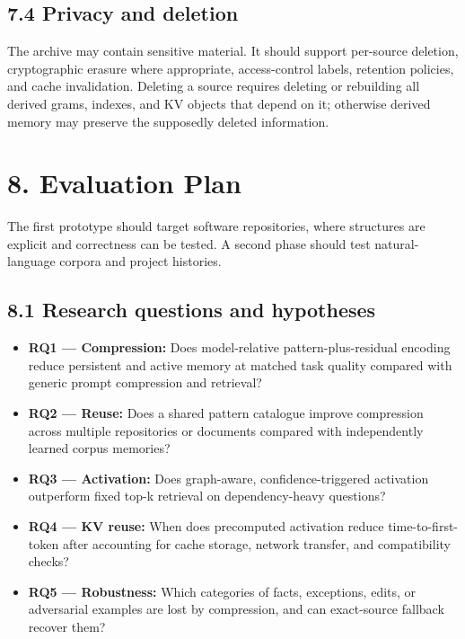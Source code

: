 \documentclass[
  10pt,
]{article}
\providecommand{\tightlist}{%
  \setlength{\itemsep}{0pt}\setlength{\parskip}{0pt}}
\begin{document}
\subsection{7.4 Privacy and deletion}\label{privacy-and-deletion}

The archive may contain sensitive material. It should support per-source
deletion, cryptographic erasure where appropriate, access-control
labels, retention policies, and cache invalidation. Deleting a source
requires deleting or rebuilding all derived grams, indexes, and KV
objects that depend on it; otherwise derived memory may preserve the
supposedly deleted information.

\section{8. Evaluation Plan}\label{evaluation-plan}

The first prototype should target software repositories, where
structures are explicit and correctness can be tested. A second phase
should test natural-language corpora and project histories.

\subsection{8.1 Research questions and
hypotheses}\label{research-questions-and-hypotheses}

\begin{itemize}
\tightlist
\item
  \textbf{RQ1 --- Compression:} Does model-relative
  pattern-plus-residual encoding reduce persistent and active memory at
  matched task quality compared with generic prompt compression and
  retrieval?
\item
  \textbf{RQ2 --- Reuse:} Does a shared pattern catalogue improve
  compression across multiple repositories or documents compared with
  independently learned corpus memories?
\item
  \textbf{RQ3 --- Activation:} Does graph-aware, confidence-triggered
  activation outperform fixed top-k retrieval on dependency-heavy
  questions?
\item
  \textbf{RQ4 --- KV reuse:} When does precomputed activation reduce
  time-to-first-token after accounting for cache storage, network
  transfer, and compatibility checks?
\item
  \textbf{RQ5 --- Robustness:} Which categories of facts, exceptions,
  edits, or adversarial examples are lost by compression, and can
  exact-source fallback recover them?
\end{itemize}
\end{document}
